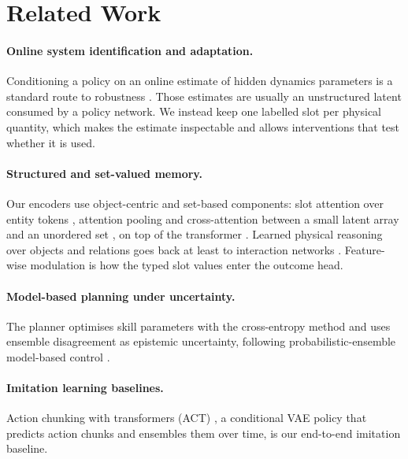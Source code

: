 \section{Related Work}
\label{sec:related}

\paragraph{Online system identification and adaptation.}
Conditioning a policy on an online estimate of hidden dynamics parameters is a standard route to robustness
\citep{yu2017uposi,kumar2021rma}. Those estimates are usually an unstructured latent consumed by a policy
network. We instead keep one labelled slot per physical quantity, which makes the estimate inspectable and
allows interventions that test whether it is used.

\paragraph{Structured and set-valued memory.}
Our encoders use object-centric and set-based components: slot attention over entity tokens
\citep{locatello2020slot}, attention pooling and cross-attention between a small latent array and an unordered
set \citep{lee2019set,jaegle2021perceiver}, on top of the transformer \citep{vaswani2017attention}. Learned
physical reasoning over objects and relations goes back at least to interaction networks
\citep{battaglia2016interaction}. Feature-wise modulation \citep{perez2018film} is how the typed slot values
enter the outcome head.

\paragraph{Model-based planning under uncertainty.}
The planner optimises skill parameters with the cross-entropy method \citep{rubinstein1999cross} and uses
ensemble disagreement as epistemic uncertainty, following probabilistic-ensemble model-based control
\citep{chua2018pets,lakshminarayanan2017ensembles}.

\paragraph{Imitation learning baselines.}
Action chunking with transformers (ACT) \citep{zhao2023act}, a conditional VAE \citep{kingma2014vae} policy
that predicts action chunks and ensembles them over time, is our end-to-end imitation baseline.

